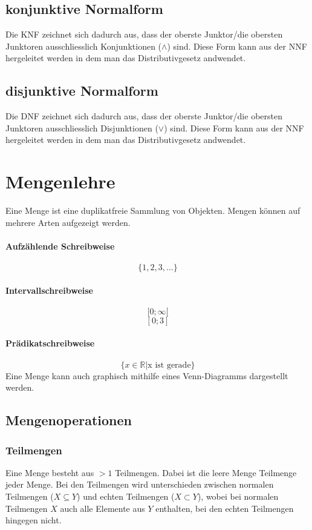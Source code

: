 \documentclass{article}
\begin{document}
\subsection{konjunktive Normalform}
Die KNF zeichnet sich dadurch aus, dass der oberste Junktor/die obersten Junktoren ausschliesslich Konjunktionen (\(\land\)) sind. Diese Form kann aus der NNF hergeleitet werden in dem man das Distributivgesetz andwendet.
\subsection{disjunktive Normalform}
Die DNF zeichnet sich dadurch aus, dass der oberste Junktor/die obersten Junktoren ausschliesslich Disjunktionen (\(\lor\)) sind. Diese Form kann aus der NNF hergeleitet werden in dem man das Distributivgesetz andwendet.
\section{Mengenlehre}
Eine Menge ist eine duplikatfreie Sammlung von Objekten.
Mengen können auf mehrere Arten aufgezeigt werden.
\paragraph{Aufzählende Schreibweise}
\[
		\{1, 2, 3, ...\}
\]
\paragraph{Intervallschreibweise}
\[
		[0;\infty[
\]
\[
		[0;3]
\]
\paragraph{Prädikatschreibweise}
\[
		\{x \in  \mathbb{R}|\text{x ist gerade}\} 
\]
Eine Menge kann auch graphisch mithilfe eines Venn-Diagramms dargestellt werden.
\subsection{Mengenoperationen}
\subsubsection{Teilmengen}
Eine Menge besteht aus \(>1\) Teilmengen. Dabei ist die leere Menge Teilmenge jeder Menge. Bei den Teilmengen wird unterschieden zwischen normalen Teilmengen (\(X \subseteq Y\)) und echten Teilmengen (\(X \subset Y\)), wobei bei normalen Teilmengen \(X\) auch alle Elemente aus \(Y\) enthalten, bei den echten Teilmengen hingegen nicht.
\end{document}
